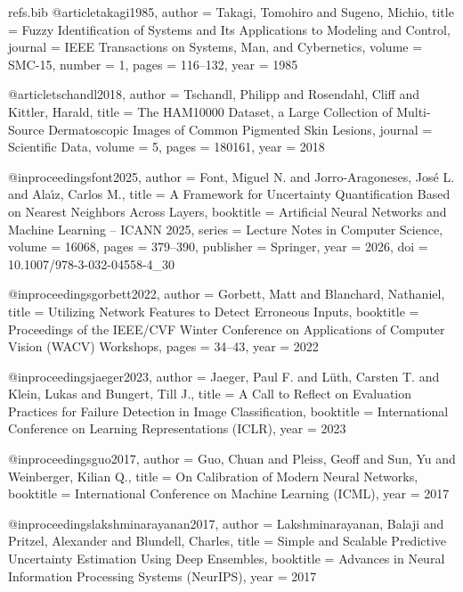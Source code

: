 \begin{filecontents*}[overwrite]{refs.bib}
@article{takagi1985,
  author  = {Takagi, Tomohiro and Sugeno, Michio},
  title   = {Fuzzy Identification of Systems and Its Applications to Modeling and Control},
  journal = {IEEE Transactions on Systems, Man, and Cybernetics},
  volume  = {SMC-15},
  number  = {1},
  pages   = {116--132},
  year    = {1985}
}

@article{tschandl2018,
  author  = {Tschandl, Philipp and Rosendahl, Cliff and Kittler, Harald},
  title   = {The {HAM10000} Dataset, a Large Collection of Multi-Source Dermatoscopic Images of Common Pigmented Skin Lesions},
  journal = {Scientific Data},
  volume  = {5},
  pages   = {180161},
  year    = {2018}
}

@inproceedings{font2025,
  author    = {Font, Miguel N. and Jorro-Aragoneses, Jos{\'e} L. and Ala{\'\i}z, Carlos M.},
  title     = {A Framework for Uncertainty Quantification Based on Nearest Neighbors Across Layers},
  booktitle = {Artificial Neural Networks and Machine Learning -- ICANN 2025},
  series    = {Lecture Notes in Computer Science},
  volume    = {16068},
  pages     = {379--390},
  publisher = {Springer},
  year      = {2026},
  doi       = {10.1007/978-3-032-04558-4_30}
}

@inproceedings{gorbett2022,
  author    = {Gorbett, Matt and Blanchard, Nathaniel},
  title     = {Utilizing Network Features to Detect Erroneous Inputs},
  booktitle = {Proceedings of the IEEE/CVF Winter Conference on Applications of Computer Vision (WACV) Workshops},
  pages     = {34--43},
  year      = {2022}
}

@inproceedings{jaeger2023,
  author    = {Jaeger, Paul F. and L{\"u}th, Carsten T. and Klein, Lukas and Bungert, Till J.},
  title     = {A Call to Reflect on Evaluation Practices for Failure Detection in Image Classification},
  booktitle = {International Conference on Learning Representations (ICLR)},
  year      = {2023}
}

@inproceedings{guo2017,
  author    = {Guo, Chuan and Pleiss, Geoff and Sun, Yu and Weinberger, Kilian Q.},
  title     = {On Calibration of Modern Neural Networks},
  booktitle = {International Conference on Machine Learning (ICML)},
  year      = {2017}
}

@inproceedings{lakshminarayanan2017,
  author    = {Lakshminarayanan, Balaji and Pritzel, Alexander and Blundell, Charles},
  title     = {Simple and Scalable Predictive Uncertainty Estimation Using Deep Ensembles},
  booktitle = {Advances in Neural Information Processing Systems (NeurIPS)},
  year      = {2017}
}


\end{filecontents*}
